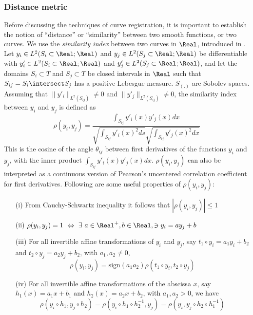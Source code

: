 \subsubsection*{Distance metric}
Before discussing the techniques of curve registration, it is important to establish the notion of ``distance'' or ``similarity'' between two smooth functions, or two curves. We use the {\emph{similarity index}} between two curves in $\Real$, introduced in \cite{Sangalli_etal_2009_JASA}. Let $y_i \in L^2(S_i \subset \Real; \Real)$ and $y_j \in L^2(S_j \subset \Real; \Real)$ be differentiable with $y'_i \in L^2(S_i \subset \Real; \Real)$ and $y'_j \in L^2(S_j \subset \Real; \Real)$, and let the domains $S_i \subset T$ and $S_j  \subset T$ be closed intervals in $\Real$ such that $S_{ij} = S_i \intersect S_j$ has a positive Lebesgue measure. $S_{(.)}$ are Sobolev spaces. Assuming that $\|y'_i\|_{L^2(S_{ij})} \ne 0$ and $\|y'_j\|_{L^2(S_{ij})} \ne 0$, the similarity index between $y_i$ and $y_j$ is defined as
\begin{equation}
\rho(y_i, y_j) = \frac{\int _{S_{ij}}y'_i(x)y'_j(x) dx}{\sqrt{\int _{S_{ij}}y'_i(x)^2 ds}\sqrt{ \int _{S_{ij}} y'_j(x)^2 dx}}
\label{eq:3_similarity}
\end{equation}
This is the cosine of the angle $\theta_{ij}$ between first derivatives of the functions $y_i$ and $y_j$, with the inner product $\int _{S_{ij}}y'_i(x)y'_j(x) dx$.  $\rho(y_i, y_j)$ can also be interpreted as a continuous version of Pearson’s uncentered correlation coefficient for first derivatives. Following are some useful properties of $\rho(y_i, y_j)$:
\begin{enumerate}
\item[(i)] From Cauchy-Schwartz inequality it follows that $|\rho(y_i, y_j)| \leq 1$
\item[(ii)] $\rho(y_i, y_j) = 1 \ \Leftrightarrow \ \exists \ a \in \Real^{+}, b \in \Real, \ni y_i = ay_j + b $
\item[(iii)] For all invertible affine transformations of $y_i$ and $y_j$, say $t_1 \circ y_i = a_1y_i + b_2$ and $t_2 \circ y_j = a_2y_j + b_2$, with $a_1, a_2 \ne 0$, 
\[ \rho(y_i, y_j) = \text{sign}(a_1 a_2)\rho(t_1 \circ y_i, t_2 \circ y_j)\]
\item[(iv)] For all invertible affine transformations of the abscissa $x$, say $h_1(x) = a_1 x + b_1$ and $h_2(x) = a_2 x + b_2$, with $a_1, a_2 > 0$, we have
\[ \rho(y_i \circ h_1, y_j \circ h_2) = \rho(y_i \circ h_1 \circ h_2^{-1}, y_j) = \rho(y_i , y_j \circ h_2 \circ h_1^{-1}) \]
\end{enumerate}


